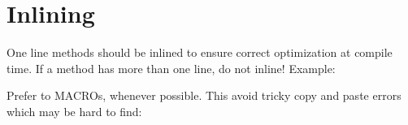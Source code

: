 \section{Inlining}
One line methods should be inlined to ensure correct optimization at compile 
time. If a method has more than one line, do not inline! Example:

Prefer  to MACROs, whenever possible. This avoid tricky copy and 
paste errors which may be hard to find:
